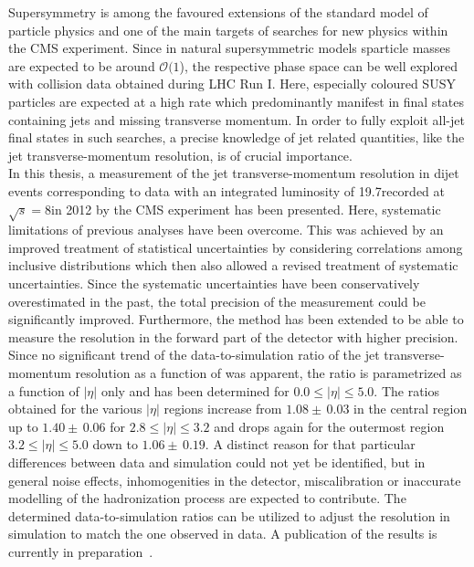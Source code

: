 Supersymmetry is among the favoured extensions of the standard model of particle physics and one of the main targets of searches for new physics within the CMS experiment. Since in natural supersymmetric models sparticle masses are expected to be around $\mathcal{O}(1$\tev), the respective phase space can be well explored with \pp collision data obtained during LHC Run I. Here, especially coloured SUSY particles are expected at a high rate which predominantly manifest in final states containing jets and missing transverse momentum. In order to fully exploit all-jet final states in such searches, a precise knowledge of jet related quantities, like the jet transverse-momentum resolution, is of crucial importance. \\
In this thesis, a measurement of the jet transverse-momentum resolution in dijet events corresponding to data with an integrated luminosity of 19.7\fbinv recorded at $\sqrt{s}=8$\tev in 2012 by the CMS experiment has been presented. Here, systematic limitations of previous analyses have been overcome. This was achieved by an improved treatment of statistical uncertainties by considering correlations among inclusive distributions which then also allowed a revised treatment of systematic uncertainties. Since the systematic uncertainties have been conservatively overestimated in the past, the total precision of the measurement could be significantly improved. Furthermore, the method has been extended to be able to measure the resolution in the forward part of the detector with higher precision. Since no significant trend of the data-to-simulation ratio of the jet transverse-momentum resolution as a function of \ptave was apparent, the ratio is parametrized as a function of $|\eta|$ only and has been determined for $0.0 \leq |\eta| \leq 5.0$. The ratios obtained for the various $|\eta|$ regions increase from $1.08\pm \, 0.03$ in the central region up to $1.40\pm \, 0.06$ for $2.8 \leq |\eta| \leq 3.2$ and drops again for the outermost region $3.2 \leq |\eta| \leq 5.0$ down to $1.06\pm \, 0.19$. A distinct reason for that particular differences between data and simulation could not yet be identified, but in general noise effects, inhomogenities in the detector, miscalibration or inaccurate modelling of the hadronization process are expected to contribute. The determined data-to-simulation ratios can be utilized to adjust the resolution in simulation to match the one observed in data. A publication of the results is currently in preparation~\cite{CMS-JME-13-004}. \\
